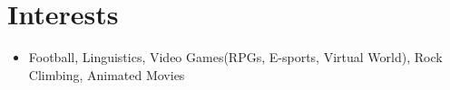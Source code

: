 \documentclass[letterpaper,10pt]{article}
\begin{document}
\section{Interests}
\begin{itemize}
  \item Football, Linguistics, Video Games(RPGs, E-sports, Virtual World), Rock Climbing, Animated Movies
\end{itemize}
\end{document}
